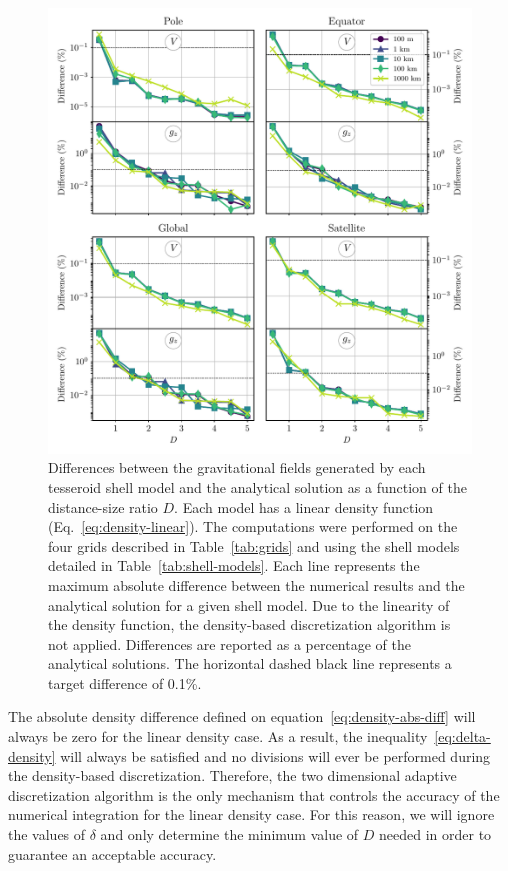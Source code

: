 \documentclass[extra, referee]{gji}
\begin{document}
\begin{figure}
\centering
\includegraphics[width=\linewidth]{figures/linear-density-diffs.pdf}
\caption{
    Differences between the gravitational fields generated by each tesseroid shell model
    and the analytical solution as a function of the distance-size ratio $D$.
    Each model has a linear density function (Eq.~\ref{eq:density-linear}).
    The computations were performed on the four grids described in Table~\ref{tab:grids}
    and using the shell models detailed in Table~\ref{tab:shell-models}.
    Each line represents the maximum absolute difference between the numerical results
    and the analytical solution for a given shell model.
    Due to the linearity of the density function, the density-based discretization
    algorithm is not applied.
    Differences are reported as a percentage of the analytical solutions.
    The horizontal dashed black line represents a target difference of 0.1\%.
}
\label{fig:D-linear}
\end{figure}

The absolute density difference defined on equation~\ref{eq:density-abs-diff} will
always be zero for the linear density case.
As a result, the inequality~\ref{eq:delta-density} will always be satisfied and no
divisions will ever be performed during the density-based discretization.
Therefore, the two dimensional adaptive discretization algorithm is the
only mechanism that controls the accuracy of the numerical integration for the linear
density case.
For this reason, we will ignore the values of $\delta$ and only determine the minimum
value of $D$ needed in order to guarantee an acceptable accuracy.
\end{document}
